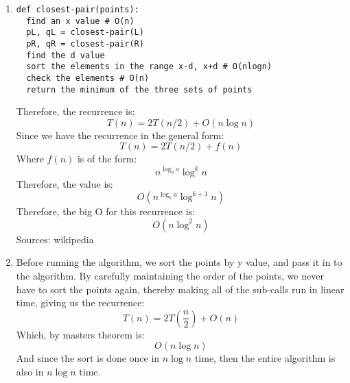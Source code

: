\documentclass[11pt]{article}
\begin{document}
\begin{enumerate}
\begin{enumerate}
\item
\begin{verbatim}
def closest-pair(points):
  find an x value # O(n)
  pL, qL = closest-pair(L)
  pR, qR = closest-pair(R)
  find the d value
  sort the elements in the range x-d, x+d # O(nlogn)
  check the elements # O(n)
  return the minimum of the three sets of points
\end{verbatim}
Therefore, the recurrence is:
\begin{equation*}
T(n) = 2T(n/2) + O(n\log n)
\end{equation*}
Since we have the recurrence in the general form:
\begin{equation*}
T(n) = 2T(n/2) + f(n)
\end{equation*}
Where $f(n)$ is of the form:
\begin{equation*}
n^{\log_b a} \log^k n
\end{equation*}
Therefore, the value is:
\begin{equation*}
O(n^{\log_b a} \log^{k+1} n)
\end{equation*}
Therefore, the big O for this recurrence is:
\begin{equation*}
O(n\log^2n)
\end{equation*}
Sources: wikipedia
\item
Before running the algorithm, we sort the points by y value, and pass it in
to the algorithm. By carefully maintaining the order of the points, we never
have to sort the points again, thereby making all of the sub-calls run in linear
time, giving us the recurrence:
\begin{equation*}
T(n) = 2T\left( \frac{n}{2} \right) + O(n)
\end{equation*}
Which, by masters theorem is:
\begin{equation*}
O(n \log n)
\end{equation*}
And since the sort is done once in $n \log n$ time, then the entire algorithm is
also in $n \log n$ time. 
\end{enumerate}
\end{enumerate}
\end{document}
